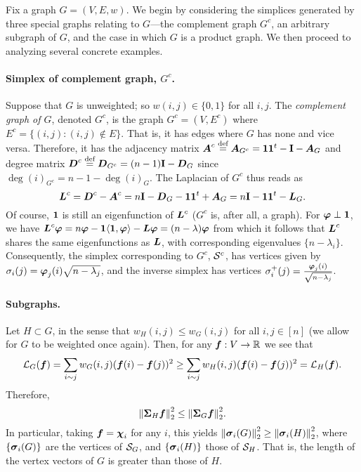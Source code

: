 Fix a graph $G=(V,E,w)$. 
We begin by considering the simplices generated by three special graphs relating to $G$---the complement graph $G^c$, an arbitrary subgraph of $G$, and the case in which $G$ is a product graph. 
We then proceed to analyzing several concrete examples. 


\paragraph{Simplex of complement graph, $G^c$.}
Suppose that $G$ is unweighted; so $w(i,j)\in\{0,1\}$ for all $i,j$. The \emph{complement graph of $G$}, denoted $G^c$, 
is the graph $G^c=(V,E^c)$ where $E^c = \{(i,j):(i,j)\notin E\}$. That is, it has edges where $G$ has none and vice versa. Therefore, it has the adjacency matrix $\vb*{A}^c\overset{\text{def}}{=} \vb*{A}_{G^c}=\vb{1}\vb{1}^t - \vb{I}-\vb*{A}_G$ and degree matrix $\vb*{D}^c\overset{\text{def}}{=} \vb*{D}_{G^c}=(n-1)\vb{I}-\vb*{D}_G$ since $\deg(i)_{G^c}=n-1-\deg(i)_G$. The Laplacian of $G^c$ thus reads as 
\[\vb*{L}^c=\vb*{D}^c-\vb*{A}^c=n\vb{I}-\vb*{D}_G-\vb{1}\vb{1}^t+\vb*{A}_G=n\vb{I}-\vb{1}\vb{1}^t-\vb*{L}_G.\]
Of course, $\vb{1}$ is still an eigenfunction of $\vb*{L}^c$ ($G^c$ is, after all, a graph). For $\vb*{\varphi}\perp \vb{1}$, we have 
$\vb*{L}^c\vb*{\varphi} = n\vb*{\varphi} - \vb{1}\langle \vb{1},\vb*{\varphi}\rangle - \vb*{L}\vb*{\varphi} = (n-\lambda)\vb*{\varphi}$
from which it follows that $\vb*{L}^c$ shares the same eigenfunctions as $\vb*{L}$, with corresponding eigenvalues $\{n-\lambda_i\}$. Consequently, the simplex corresponding to $G^c$, $\mathcal{S}^c$, has vertices given by 
$\sigma_i(j) = \vb*{\varphi}_j(i) \sqrt{n-\lambda_j}$, 
and the inverse simplex has vertices 
$\sigma_i^+(j)=\frac{\vb*{\varphi}_j(i)}{\sqrt{n-\lambda_j}}$. 



\paragraph{Subgraphs.}
Let $H\subset G$, in the sense that $w_H(i,j)\leq w_G(i,j)$ for all $i,j\in [n]$ (we allow for $G$ to be weighted once again). Then, for any $\vb*{f}:V\to\mathbb{R}$ we see that 
\[\mathcal{L}_G(\vb*{f})=\sum_{i\sim j}w_G(i,j)(\vb*{f}(i)-\vb*{f}(j))^2 \geq \sum_{i\sim j}w_H(i,j)(\vb*{f}(i)-\vb*{f}(j))^2 =\mathcal{L}_H(\vb*{f}).\]
Therefore, 
\begin{equation*}
\norm{\boldsymbol{\Sigma}_H \vb*{f}}_2^2 \leq \norm{\boldsymbol{\Sigma}_G \vb*{f}}_2^2. 
\end{equation*}
In particular, taking $\vb*{f}=\boldsymbol{\chi}_i$ for any $i$, this yields $\norm{\vb*{\sigma}_i(G)}_2^2\geq \norm{\vb*{\sigma}_i(H)}_2^2$, where $\{\vb*{\sigma}_i(G)\}$ are the vertices of $\mathcal{S}_G$, and $\{\vb*{\sigma}_i(H)\}$ those of $\mathcal{S}_H$. That is, the length of the vertex vectors of $G$ is greater than those of $H$. 


